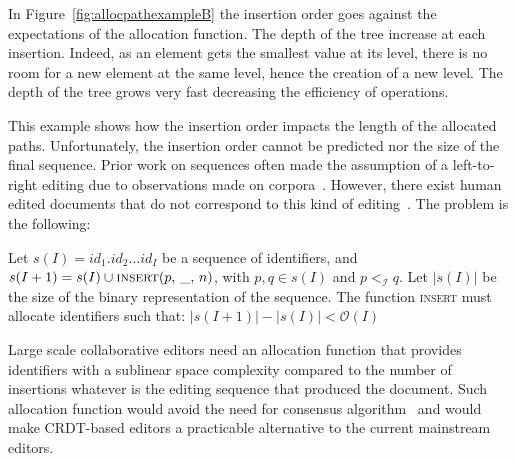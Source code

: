 In Figure~\ref{fig:allocpathexampleB} the insertion order goes against the
expectations of the allocation function. The depth of the tree increase at each
insertion. Indeed, as an element gets the smallest value at its level, there is
no room for a new element at the same level, hence the creation of a new
level. The depth of the tree grows very fast decreasing the efficiency of
operations.


This example shows how the insertion order impacts the length of the allocated
paths. Unfortunately, the insertion order cannot be predicted nor the size of
the final sequence. Prior work on sequences often made the assumption of a
left-to-right editing due to observations made on
corpora~\cite{preguica2009commutative, weiss2009logoot}. However, there exist
human edited documents that do not correspond to this kind of
editing~\cite{nedelec2013lseq}. The problem is the following:
\begin{problem}
  Let $s(I)= id_1.id_2\ldots id_I$ be a sequence of identifiers, and
  $s(I+1) = s(I) \cup \textsc{insert}(p,\, \_,\, n)$, with $p,q \in s(I)$ and
  $p<_\mathcal{I}q$. Let $|s(I)|$ be the size of the binary representation of
  the sequence. The function \textsc{insert} must allocate identifiers such
  that: \hspace{30pt} $|s(I+1)| - |s(I)| < \mathcal{O}(I)$ %
\end{problem}

\noindent Large scale collaborative editors need an allocation function that
provides identifiers with a sublinear space complexity compared to the number of
insertions whatever is the editing sequence that produced the document. Such
allocation function would avoid the need for consensus
algorithm~\cite{mostefaoui2015signature} and would make CRDT-based editors a
practicable alternative to the current mainstream editors.

 
